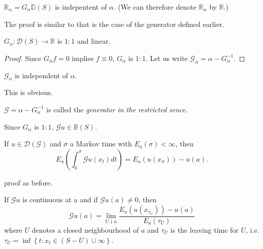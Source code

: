 \begin{thm}\label{chap2-sec9-thm6}%
$\mathbb{R}_\alpha =G_{\alpha}\mathbb{D} (S)$ is indepentent of $\alpha$. (We
can therefore denote $\mathbb{R}_{\alpha}$ by $\mathbb{R}$.) 
\end{thm}

The proof is similar to that is the case of the generator defined earlier.

\begin{thm}\label{chap2-sec9-thm7}%
  $G_\alpha : \mathscr{D} (S) \to \mathbb{R}$ is $1:1$ and linear.
\end{thm}

\begin{proof}
Since $G_\alpha f =0$ implies $f \equiv 0$, $G_\alpha$ is $1:1$. Let
  us write $\mathscr{G}_\alpha = \alpha -G^{-1}_\alpha$. 
\end{proof}

\begin{thm}\label{chap2-sec9-thm8}%
$\mathscr{G}_\alpha$ is independent of $\alpha$. 
\end{thm}

This is obvious.

\begin{defi*}
$\mathscr{G} = \alpha -G^{-1}_\alpha$ is called the {\em{generator
      in the restricted sence}}. 
\end{defi*}

Since  $G_\alpha$  is  $1:1$, $\mathscr{G} u \in
  \mathbb{B} (S)$. 

\begin{thm}\label{chap2-sec9-thm9}%
If $u \in \mathscr{D} (\mathscr{G})$ and $\sigma$ a Markov
  time with $E_a (\sigma) < \infty$, then 
$$
E_a \left(\int^\sigma_0 \mathscr{G} u (x_t) dt\right) = E_a (u
(x_\sigma)) -u (a). 
$$
\end{thm}

proof as before.

\begin{thm}[Dynkin]\label{chap2-sec9-thm10}%
If $\mathscr{G} u$ is continuous at a and if $\mathscr{G} u (a) \neq
0$, then  
$$
\mathscr{G} u (a) = \lim_{U \downarrow a} \frac{E_a (u
(x_{\tau_U})) -u (a)}{E_a (\tau_U)} 
$$\pageoriginale
where $U$ denotes a closed neighbourhood of $a$ and $\tau_U$ is the
leaving time for $U$, i.e. $\tau_U =\inf\left\{ t :x_t \in
  (S-U) \cup \infty\right\}$. 
\end{thm}

